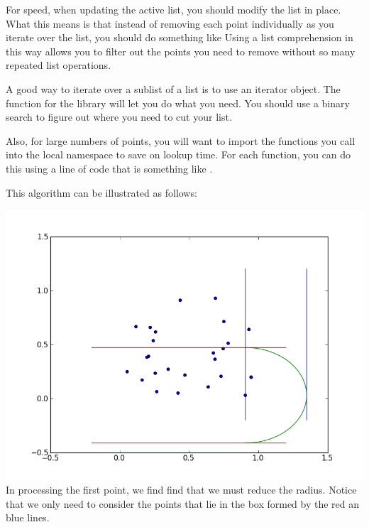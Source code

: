 For speed, when updating the active list, you should modify the list in place. What this means is that instead of removing each point individually as you iterate over the list, you should do something like  Using a list comprehension in this way allows you to filter out the points you need to remove without so many repeated list operations. 

A good way to iterate over a sublist of a list is to use an iterator object. The function  for the  library will let you do what you need. You should use a binary search to figure out where you need to cut your list. 

Also, for large numbers of points, you will want to import the functions you call into the local namespace to save on lookup time. For each function, you can do this using a line of code that is something like . 

This algorithm can be illustrated as follows:


\includegraphics[width = \textwidth]{ptsweep1.png}
In processing the first point, we find find that we must reduce the radius. Notice that we only need to consider the points that lie in the box formed by the red an blue lines.


